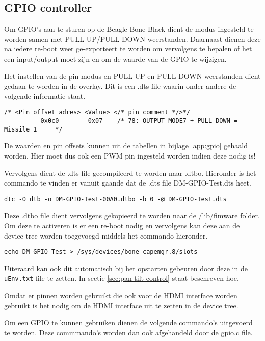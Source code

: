 \subsection{GPIO controller}
\label{sec:gpio}

Om GPIO's aan te sturen op de Beagle Bone Black dient de modus ingesteld te worden
samen met PULL-UP/PULL-DOWN weerstanden. Daarnaast dienen deze na iedere re-boot
weer ge-exporteert te worden om vervolgens te bepalen of het een input/output moet
zijn en om de waarde van de GPIO te wijzigen.

Het instellen van de pin modus en PULL-UP en PULL-DOWN weerstanden dient gedaan te
worden in de overlay. Dit is een .dts file waarin onder andere de volgende informatie 
staat.

\begin{verbatim}
/* <Pin offset adres> <Value> </* pin comment */>*/
          0x0c0        0x07    /* 78: OUTPUT MODE7 + PULL-DOWN = Missile 1     */
\end{verbatim}

De waarden en pin offsets kunnen uit de tabellen in bijlage \ref{app:gpio} gehaald worden. Hier
moet dus ook een PWM pin ingesteld worden indien deze nodig is!

Vervolgens dient de .dts file gecompileerd te worden naar .dtbo. Hieronder is het
commando te vinden er vanuit gaande dat de .dts file DM-GPIO-Test.dts heet.

\begin{verbatim}
dtc -O dtb -o DM-GPIO-Test-00A0.dtbo -b 0 -@ DM-GPIO-Test.dts
\end{verbatim}

Deze .dtbo file dient vervolgens gekopieerd te worden naar de /lib/fimware folder.
Om deze te activeren is er een re-boot nodig en vervolgens kan deze aan de device 
tree worden toegevoegd middels het commando hieronder.

\begin{verbatim}
echo DM-GPIO-Test > /sys/devices/bone_capemgr.8/slots
\end{verbatim}

Uiteraard kan ook dit automatisch bij het opstarten gebeuren door deze in de
\texttt{uEnv.txt} file te zetten. In sectie \ref{sec:pan-tilt-control} staat
beschreven hoe.

Omdat er pinnen worden gebruikt die ook voor de HDMI interface worden gebruikt 
is het nodig om de HDMI interface uit te zetten in de device tree.

Om een GPIO te kunnen gebruiken dienen de volgende commando's uitgevoerd te worden.
Deze commmando's worden dan ook afgehandeld door de gpio.c file.

